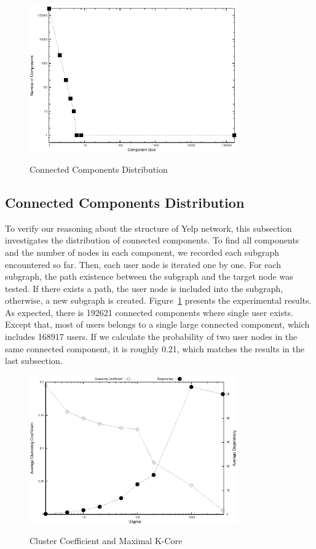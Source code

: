 \documentclass[11pt, oneside]{article}   	%
\begin{document}
\begin{figure}[t]
  \centering
  \caption{Connected Components Distribution} 
       \includegraphics[width=0.8\textwidth]{figures/ccd.eps}
  \label{fig:ccd}
\end{figure}   

\subsection{Connected Components Distribution}
To verify our reasoning about the structure of Yelp network, this subsection investigates the distribution of connected 
components. To find all components and the number of nodes in each component, we recorded each subgraph encountered 
so far.  Then, each user node is iterated one by one. For each subgraph, the path existence between the subgraph and 
the target node was tested. If there exists a path, the user node is included into the subgraph, otherwise, a new subgraph is
created. Figure~\ref{fig:ccd} presents the experimental results. As expected, there is 192621 connected components where
single user exists. Except that, most of users belongs to a single large connected component, which includes 168917 users. 
If we calculate the probability of two user nodes in the same connected component, it is roughly 0.21, which matches
the results in the last subsection.  

\begin{figure}[t]
  \centering
  \caption{Cluster Coefficient and Maximal K-Core} 
       \includegraphics[width=0.8\textwidth]{figures/coefficient.eps}
  \label{fig:coefficient}
\end{figure}  
\end{document}
